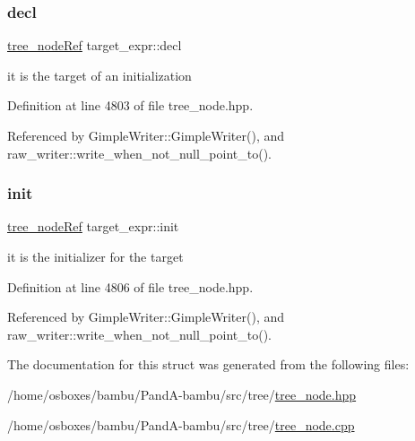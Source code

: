 \subsubsection{\texorpdfstring{decl}{decl}}
{\footnotesize\ttfamily \hyperlink{tree__node_8hpp_a6ee377554d1c4871ad66a337eaa67fd5}{tree\+\_\+node\+Ref} target\+\_\+expr\+::decl}



it is the target of an initialization 



Definition at line 4803 of file tree\+\_\+node.\+hpp.



Referenced by Gimple\+Writer\+::\+Gimple\+Writer(), and raw\+\_\+writer\+::write\+\_\+when\+\_\+not\+\_\+null\+\_\+point\+\_\+to().

\mbox{\label{structtarget__expr_adc1b8734f1761bd4e9e6feaa3a845bbc}} 
\subsubsection{\texorpdfstring{init}{init}}
{\footnotesize\ttfamily \hyperlink{tree__node_8hpp_a6ee377554d1c4871ad66a337eaa67fd5}{tree\+\_\+node\+Ref} target\+\_\+expr\+::init}



it is the initializer for the target 



Definition at line 4806 of file tree\+\_\+node.\+hpp.



Referenced by Gimple\+Writer\+::\+Gimple\+Writer(), and raw\+\_\+writer\+::write\+\_\+when\+\_\+not\+\_\+null\+\_\+point\+\_\+to().



The documentation for this struct was generated from the following files\+:\begin{DoxyCompactItemize}
\item 
/home/osboxes/bambu/\+Pand\+A-\/bambu/src/tree/\hyperlink{tree__node_8hpp}{tree\+\_\+node.\+hpp}\item 
/home/osboxes/bambu/\+Pand\+A-\/bambu/src/tree/\hyperlink{tree__node_8cpp}{tree\+\_\+node.\+cpp}\end{DoxyCompactItemize}
